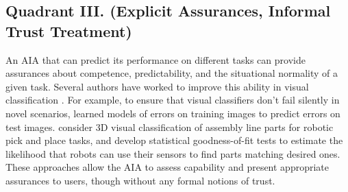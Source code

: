 \subsection{Quadrant III. (Explicit Assurances, Informal Trust Treatment)}\label{sec:q3}
An AIA that can predict its performance on different tasks can provide assurances about competence, predictability, and the situational normality of a given task. Several authors have worked to improve this ability in visual classification \cite{Zhang2014-he,Gurau2016-hs,Churchill2015-ei,Kaipa2015-hy}. 
For example, to ensure that visual classifiers don't fail silently in novel scenarios, 
\citet{Zhang2014-he} learned models of errors on training images to predict errors on test images. 
\citet{Kaipa2015-hy} consider 3D visual classification of assembly line parts for robotic pick and place tasks, and develop statistical goodness-of-fit tests to estimate the likelihood that robots can use their sensors to find parts matching desired ones. %
These approaches allow the AIA to assess capability and present appropriate assurances to users, though without any formal notions of trust. 


